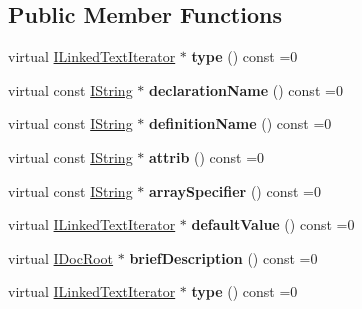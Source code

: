 \subsection*{Public Member Functions}
\begin{DoxyCompactItemize}
\item 
\mbox{\label{class_i_param_a9a1fb4ebb97202911af94b3ef78bf60f}} 
virtual \mbox{\hyperlink{class_i_linked_text_iterator}{I\+Linked\+Text\+Iterator}} $\ast$ {\bfseries type} () const =0
\item 
\mbox{\label{class_i_param_a675ec79c839702cea2d5f182201d76fd}} 
virtual const \mbox{\hyperlink{class_i_string}{I\+String}} $\ast$ {\bfseries declaration\+Name} () const =0
\item 
\mbox{\label{class_i_param_af616b2e255f9216395d730e7f4d811b8}} 
virtual const \mbox{\hyperlink{class_i_string}{I\+String}} $\ast$ {\bfseries definition\+Name} () const =0
\item 
\mbox{\label{class_i_param_af622c7971fe6889852cc33abba09aa9e}} 
virtual const \mbox{\hyperlink{class_i_string}{I\+String}} $\ast$ {\bfseries attrib} () const =0
\item 
\mbox{\label{class_i_param_a5dfe6801a6b95b7ca48f840cd3d004e5}} 
virtual const \mbox{\hyperlink{class_i_string}{I\+String}} $\ast$ {\bfseries array\+Specifier} () const =0
\item 
\mbox{\label{class_i_param_aa9f4f8b678c0a3dbe2e716ff08ea1e26}} 
virtual \mbox{\hyperlink{class_i_linked_text_iterator}{I\+Linked\+Text\+Iterator}} $\ast$ {\bfseries default\+Value} () const =0
\item 
\mbox{\label{class_i_param_a180c3c07fa5bc453b8f9497a20fef898}} 
virtual \mbox{\hyperlink{class_i_doc_root}{I\+Doc\+Root}} $\ast$ {\bfseries brief\+Description} () const =0
\item 
\mbox{\label{class_i_param_a9a1fb4ebb97202911af94b3ef78bf60f}} 
virtual \mbox{\hyperlink{class_i_linked_text_iterator}{I\+Linked\+Text\+Iterator}} $\ast$ {\bfseries type} () const =0
\item 
\mbox{\label{class_i_param_a675ec79c839702cea2d5f182201d76fd}} 

\end{DoxyCompactItemize}
